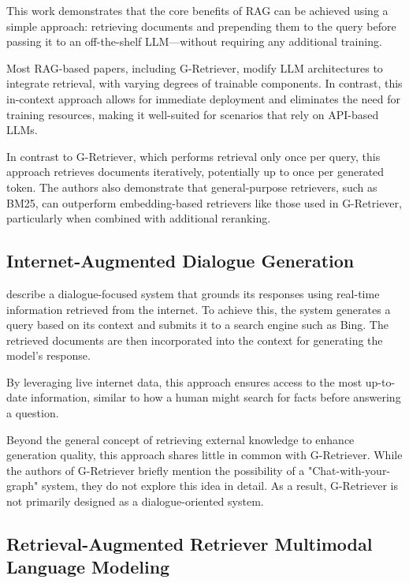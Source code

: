 This work \cite{in-context} demonstrates that the core benefits of RAG can be achieved using a simple approach: retrieving documents and prepending them to the query before passing it to an off-the-shelf LLM—without requiring any additional training.

Most RAG-based papers, including G-Retriever, modify LLM architectures to integrate retrieval, with varying degrees of trainable components.
In contrast, this in-context approach allows for immediate deployment and eliminates the need for training resources, making it well-suited for scenarios that rely on API-based LLMs.

In contrast to G-Retriever, which performs retrieval only once per query, this approach retrieves documents iteratively, potentially up to once per generated token.
The authors also demonstrate that general-purpose retrievers, such as BM25, can outperform embedding-based retrievers like those used in G-Retriever, particularly when combined with additional reranking.


\subsection{Internet-Augmented Dialogue Generation}

\citet{komeili-etal-2022-internet} describe a dialogue-focused system that grounds its responses using real-time information retrieved from the internet.
To achieve this, the system generates a query based on its context and submits it to a search engine such as Bing.
The retrieved documents are then incorporated into the context for generating the model’s response.

By leveraging live internet data, this approach ensures access to the most up-to-date information, similar to how a human might search for facts before answering a question.

Beyond the general concept of retrieving external knowledge to enhance generation quality, this approach shares little in common with G-Retriever.
While the authors of G-Retriever \cite{g-retriever} briefly mention the possibility of a "Chat-with-your-graph" system, they do not explore this idea in detail.
As a result, G-Retriever is not primarily designed as a dialogue-oriented system.

\subsection{Retrieval-Augmented Retriever Multimodal Language Modeling}

